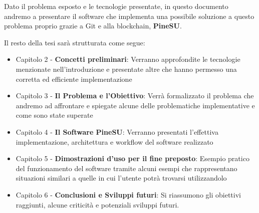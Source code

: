 Dato il problema esposto e le tecnologie presentate, in questo documento andremo a
presentare il software che implementa una possibile soluzione a questo problema
proprio grazie a Git e alla blockchain, \textbf{PineSU}.

Il resto della tesi sarà strutturata come segue:
\begin{itemize}
    \item Capitolo 2 - \textbf{Concetti preliminari}: Verranno approfondite le tecnologie menzionate nell’introduzione e presentate altre che hanno permesso una corretta ed efficiente implementazione
    \item Capitolo 3 - \textbf{Il Problema e l’Obiettivo}: Verrà formalizzato il problema che andremo ad affrontare e spiegate alcune delle problematiche implementative e come sono state superate
    \item Capitolo 4 - \textbf{Il Software PineSU}: Verranno presentati l’effettiva implementazione, architettura e workflow del software realizzato
    \item Capitolo 5 - \textbf{Dimostrazioni d’uso per il fine preposto}: Esempio pratico del funzionamento del software tramite alcuni esempi che rappresentano situazioni similari a quelle in cui l’utente potrà trovarsi utilizzandolo
    \item Capitolo 6 - \textbf{Conclusioni e Sviluppi futuri}: Si riassumono gli obiettivi raggiunti, alcune criticità e potenziali sviluppi futuri.
\end{itemize}
